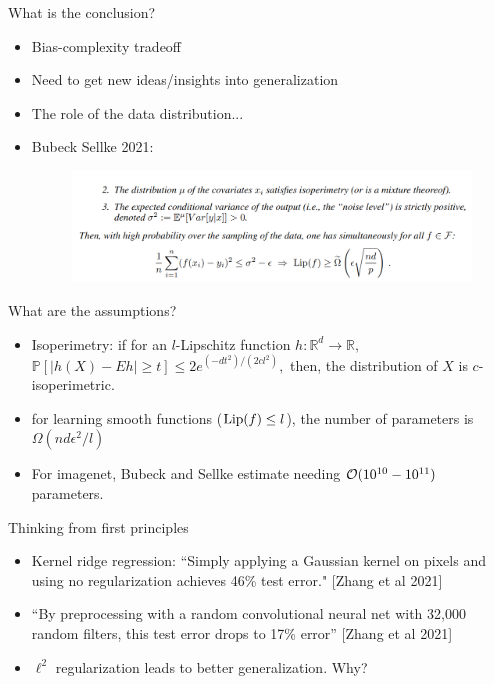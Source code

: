 \documentclass[final]{beamer}
\begin{document}
\begin{frame}{What is the conclusion?}
\begin{itemize}
	\item Bias-complexity tradeoff
	\pause
	\item Need to get new ideas/insights into generalization
	\pause
	\item The role of the data distribution...
	\pause
	\item Bubeck Sellke 2021:
	\begin{figure}
	\includegraphics[width=\textwidth]{bubeckSellke.png}
	\end{figure}

\end{itemize}
\end{frame}
\begin{frame}{What are the assumptions?}
	\begin{itemize}
		\item Isoperimetry: if for an $l$-Lipschitz function $h:\mathbb{R}^d\to\mathbb{R},$ $\mathbb{P}[|h(X) - E h|\geq t]\leq 2 e^{(-dt^2)/(2 cl^2)},$ then, the distribution of $X$ is $c$-isoperimetric. 
		\item for learning smooth functions (${\rm Lip}(f)\leq l$), the number of parameters is $\Omega(nd\epsilon^2/l)$
		\pause
	\item For imagenet, Bubeck and Sellke estimate needing ${\cal O}(10^{10}-10^{11})$ parameters.
	\end{itemize}

\end{frame}
\begin{frame}{Thinking from first principles}
	\begin{itemize}
		\item Kernel ridge regression: ``Simply applying
a Gaussian kernel on pixels and using no regularization
			achieves 46\% test error." [Zhang et al 2021]
		\pause
		\item ``By preprocessing with a random
convolutional neural net with 32,000 random filters, this
test error drops to 17\% error'' [Zhang et al 2021]
		\pause
		\item $\ell^2$ regularization leads to better generalization. Why?



	\end{itemize}
\end{frame}
\end{document}
